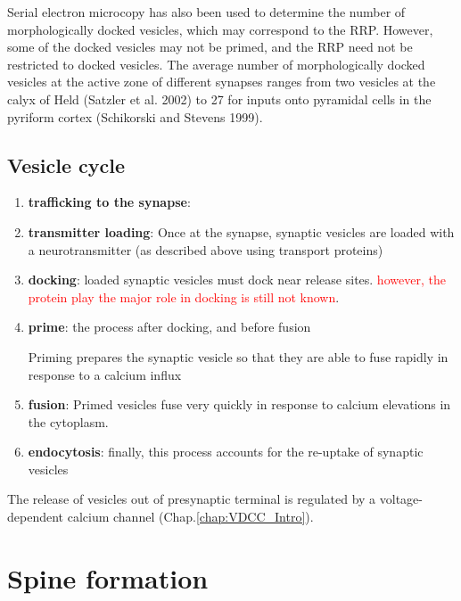\begin{itemize}
Serial electron microcopy has also been used to determine the number
of morphologically docked vesicles, which may correspond to the RRP.
However, some of the docked vesicles may not be primed, and the RRP need not be
restricted to docked vesicles.
The average number of morphologically docked vesicles at the active zone of
different synapses ranges from two vesicles at the calyx of Held (Satzler et al.
2002) to 27 for inputs onto pyramidal cells in the pyriform cortex (Schikorski
and Stevens 1999).
  
\end{itemize}

\subsection{Vesicle cycle}

\begin{enumerate}
  \item {\bf trafficking to the synapse}: 
  
  \item {\bf transmitter loading}: Once at the synapse, synaptic vesicles are
  loaded with a neurotransmitter (as described above using transport proteins)
  
  \item {\bf docking}: loaded synaptic vesicles must dock near release sites.
  \textcolor{red}{however, the protein play the major role in docking is still
  not known}.
  
  \item {\bf prime}: the process after docking, and before fusion
  
  Priming prepares the synaptic vesicle so that they are able to fuse rapidly in
  response to a calcium influx
  
  \item {\bf fusion}: Primed vesicles fuse very quickly in response to calcium
  elevations in the cytoplasm.
  
  \item {\bf endocytosis}: finally, this process accounts for the re-uptake of
  synaptic vesicles
\end{enumerate}

The release of vesicles out of presynaptic terminal is regulated by a
voltage-dependent calcium channel (Chap.\ref{chap:VDCC_Intro}).





\section{Spine formation}
\label{sec:spine}


